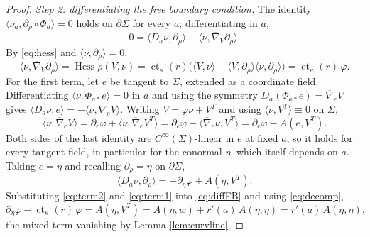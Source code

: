 \documentclass[11pt,a4paper]{amsart}
\theoremstyle{plain}
\theoremstyle{definition}
\newcommand{\ct}{\operatorname{ct}_\kappa}
\newcommand{\Hess}{\operatorname{Hess}}
\newcommand{\bconn}{\overline{\nabla}}
\begin{document}
\begin{proof}
\emph{Step 2: differentiating the free boundary condition.} The identity $\langle\nu_a,\partial_\rho\circ\Phi_a\rangle=0$ holds on $\partial\Sigma$ for every $a$; differentiating in $a$,
\begin{equation}\label{eq:diffFB}
0=\langle D_a\nu,\partial_\rho\rangle+\langle\nu,\bconn_V\partial_\rho\rangle.
\end{equation}
By \eqref{eq:hess} and $\langle\nu,\partial_\rho\rangle=0$,
\begin{equation}\label{eq:term2}
\langle\nu,\bconn_V\partial_\rho\rangle=\Hess\rho(V,\nu)=\ct(r)\bigl(\langle V,\nu\rangle-\langle V,\partial_\rho\rangle\langle\nu,\partial_\rho\rangle\bigr)=\ct(r)\,\varphi.
\end{equation}
For the first term, let $e$ be tangent to $\Sigma$, extended as a coordinate field. Differentiating $\langle\nu,\Phi_{a*}e\rangle=0$ in $a$ and using the symmetry $D_a(\Phi_{a*}e)=\bconn_eV$ gives $\langle D_a\nu,e\rangle=-\langle\nu,\bconn_eV\rangle$. Writing $V=\varphi\nu+V^T$ and using $\langle\nu,V^T\rangle\equiv 0$ on $\Sigma$,
\[
\langle\nu,\bconn_eV\rangle=\partial_e\varphi+\langle\nu,\bconn_eV^T\rangle=\partial_e\varphi-\langle\bconn_e\nu,V^T\rangle=\partial_e\varphi-A(e,V^T).
\]
Both sides of the last identity are $C^\infty(\Sigma)$-linear in $e$ at fixed $a$, so it holds for every tangent field, in particular for the conormal $\eta$, which itself depends on $a$. Taking $e=\eta$ and recalling $\partial_\rho=\eta$ on $\partial\Sigma$,
\begin{equation}\label{eq:term1}
\langle D_a\nu,\partial_\rho\rangle=-\partial_\eta\varphi+A(\eta,V^T).
\end{equation}
Substituting \eqref{eq:term2} and \eqref{eq:term1} into \eqref{eq:diffFB} and using \eqref{eq:decomp},
\[
\partial_\eta\varphi-\ct(r)\,\varphi=A(\eta,V^T)=A(\eta,w)+r'(a)\,A(\eta,\eta)=r'(a)\,A(\eta,\eta),
\]
the mixed term vanishing by Lemma \ref{lem:curvline}.
\end{proof}
\end{document}

